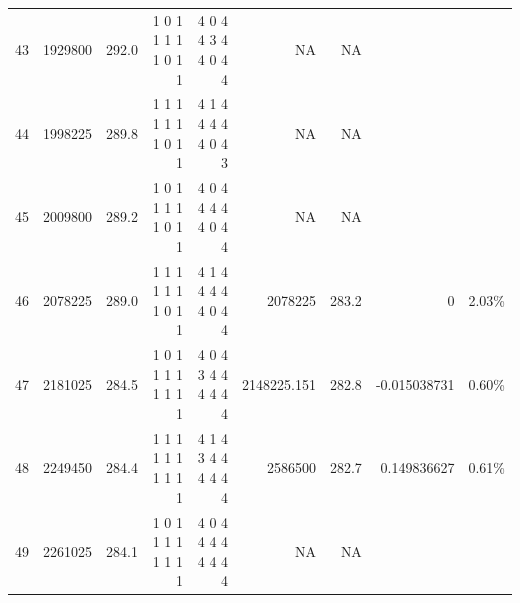 \documentclass[10pt,journal,compsoc]{IEEEtran}
\begin{document}
\begin{table}[h]
{\begin{tabular}{|*{9}{r|}}
43	&1929800&   292.0	&1 0 1 1 1 1 1 0 1 1	&4 0 4 4 3 4 4 0 4 4	&			NA	&NA&&\\
44	&1998225&   289.8	&1 1 1 1 1 1 1 0 1 1	&4 1 4 4 4 4 4 0 4 3	&			NA	&NA&&\\
45	&2009800&   289.2	&1 0 1 1 1 1 1 0 1 1	&4 0 4 4 4 4 4 0 4 4	&			NA	&NA&&\\
46	&2078225&   289.0	&1 1 1 1 1 1 1 0 1 1	&4 1 4 4 4 4 4 0 4 4	&	     \cellcolor{blizzardblue}  2078225	&\cellcolor{blizzardblue}283.2	&\cellcolor{blizzardblue}0&\cellcolor{blizzardblue}	2.03\%\\
47	&2181025&   284.5	&1 0 1 1 1 1 1 1 1 1	&4 0 4 3 4 4 4 4 4 4	&	      \cellcolor{blizzardblue} 2148225.151&	\cellcolor{blizzardblue}282.8	&\cellcolor{blizzardblue}-0.015038731	&\cellcolor{blizzardblue}0.60\%\\
48	&2249450&   284.4	&1 1 1 1 1 1 1 1 1 1	&4 1 4 3 4 4 4 4 4 4	&	      \cellcolor{blizzardblue} 2586500	&\cellcolor{blizzardblue}282.7	&\cellcolor{blizzardblue}0.149836627	&\cellcolor{blizzardblue}0.61\%\\
49	&2261025&   284.1	&1 0 1 1 1 1 1 1 1 1	&4 0 4 4 4 4 4 4 4 4	&			NA&	NA&&\\
\hline
\end{tabular}}
\end{table}
\end{document}
